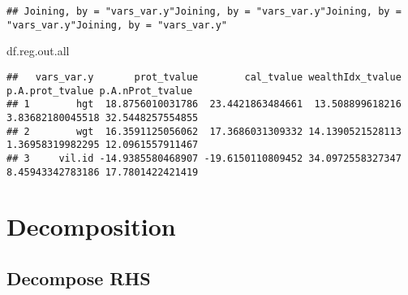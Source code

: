 \documentclass[
]{book}
\newenvironment{Shaded}{\begin{snugshade}}{\end{snugshade}}
\newcommand{\ControlFlowTok}[1]{\textcolor[rgb]{0.13,0.29,0.53}{\textbf{#1}}}
\newcommand{\DataTypeTok}[1]{\textcolor[rgb]{0.13,0.29,0.53}{#1}}
\newcommand{\KeywordTok}[1]{\textcolor[rgb]{0.13,0.29,0.53}{\textbf{#1}}}
\newcommand{\NormalTok}[1]{#1}
\newcommand{\OperatorTok}[1]{\textcolor[rgb]{0.81,0.36,0.00}{\textbf{#1}}}
\newcommand{\StringTok}[1]{\textcolor[rgb]{0.31,0.60,0.02}{#1}}
\begin{document}
\begin{Shaded}
\end{Shaded}

\begin{verbatim}
## Joining, by = "vars_var.y"Joining, by = "vars_var.y"Joining, by = "vars_var.y"Joining, by = "vars_var.y"
\end{verbatim}

\begin{Shaded}
\begin{Highlighting}[]
\NormalTok{df.reg.out.all}
\end{Highlighting}
\end{Shaded}

\begin{verbatim}
##   vars_var.y       prot_tvalue        cal_tvalue wealthIdx_tvalue  p.A.prot_tvalue p.A.nProt_tvalue
## 1        hgt  18.8756010031786  23.4421863484661  13.508899618216 3.83682180045518 32.5448257554855
## 2        wgt  16.3591125056062  17.3686031309332 14.1390521528113 1.36958319982295 12.0961557911467
## 3     vil.id -14.9385580468907 -19.6150110809452 34.0972558327347 8.45943342783186 17.7801422421419
\end{verbatim}

\hypertarget{decomposition}{%
\section{Decomposition}\label{decomposition}}

\hypertarget{decompose-rhs}{%
\subsection{Decompose RHS}\label{decompose-rhs}}
\end{document}

